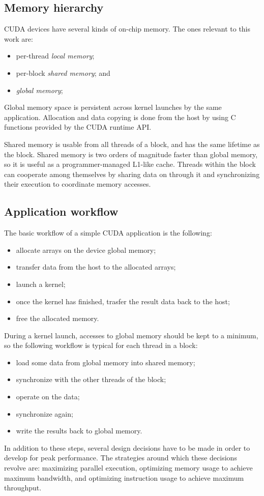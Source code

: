 \subsection{Memory hierarchy}
\label{sub:memory-hierarchy}

CUDA devices have several kinds of on-chip memory.
The ones relevant to this work are:
\begin{itemize}
  \item per-thread \emph{local memory};
  \item per-block \emph{shared memory}; and
  \item \emph{global memory};
\end{itemize}

Global memory space is persistent across kernel launches
by the same application.
Allocation and data copying is done from the host
by using C functions provided by the CUDA runtime API.

Shared memory is usable from all threads of a block,
and has the same lifetime as the block.
Shared memory is two orders of magnitude faster than global memory,
so it is useful as a programmer-managed L1-like cache.
Threads within the block can cooperate among themselves
by sharing data on through it and synchronizing their execution
to coordinate memory accesses.

\subsection{Application workflow}
\label{sub:app-workflow}

The basic workflow of a simple CUDA application is the following:
\begin{itemize}
  \item allocate arrays on the device global memory;
  \item transfer data from the host to the allocated arrays;
  \item launch a kernel;
  \item once the kernel has finished,
    trasfer the result data back to the host;
  \item free the allocated memory.
\end{itemize}

During a kernel launch,
accesses to global memory should be kept to a minimum,
so the following workflow is typical for each thread in a block:
\begin{itemize}
  \item load some data from global memory into shared memory;
  \item synchronize with the other threads of the block;
  \item operate on the data;
  \item synchronize again;
  \item write the results back to global memory.
\end{itemize}

In addition to these steps,
several design decisions have to be made
in order to develop for peak performance.
The strategies around which these decisions revolve are:
maximizing parallel execution,
optimizing memory usage to achieve maximum bandwidth, and
optimizing instruction usage to achieve maximum throughput.

